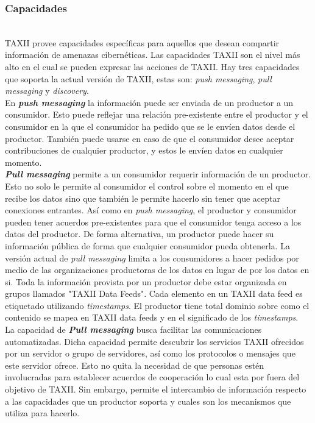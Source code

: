 \newpage
\subsubsection{Capacidades}\ \\

TAXII provee capacidades específicas para aquellos que desean compartir 
información de amenazas cibernéticas. Las capacidades TAXII son el nivel más 
alto en el cual se pueden expresar las acciones de TAXII. Hay tres capacidades 
que soporta la actual versión de TAXII, estas son: \textit{push messaging}, \textit{pull 
messaging} y \textit{discovery}.\\

En \textit{\textbf{push messaging}} la información puede ser enviada de un productor a un 
consumidor. Esto puede reflejar una relación pre-existente entre el productor y 
el consumidor en la que el consumidor ha pedido que se le envíen datos desde el 
productor. También puede usarse en caso de que el consumidor desee aceptar 
contribuciones de cualquier productor, y estos le envíen datos en cualquier 
momento.\\

\textit{\textbf{Pull messaging}} permite a un consumidor requerir información de un productor. 
Esto no solo le permite al consumidor el control sobre el momento en el que 
recibe los datos sino que también le permite hacerlo sin tener que aceptar 
conexiones entrantes. Así como en \textit{push messaging}, el productor y consumidor 
pueden tener acuerdos pre-existentes para que el consumidor tenga acceso a los 
datos del productor. De forma alternativa, un productor puede hacer su 
información pública de forma que cualquier consumidor pueda obtenerla. La 
versión actual de \textit{pull messaging} limita a los consumidores a hacer pedidos por 
medio de las organizaciones productoras de los datos en lugar de por los datos 
en si. Toda la información provista por un productor debe estar organizada en 
grupos llamados "TAXII Data Feeds". Cada elemento en un TAXII data feed es 
etiquetado utilizando \textit{timestamps}. El productor tiene total dominio sobre como el 
contenido se mapea en TAXII data feeds y en el significado de los \textit{timestamps}.\\

La capacidad de \textit{\textbf{Pull messaging}} busca facilitar las comunicaciones automatizadas. Dicha capacidad permite 
descubrir los servicios TAXII ofrecidos por un servidor o grupo de 
servidores, así como los protocolos o mensajes que este servidor ofrece. Esto no 
quita la necesidad de que personas estén involucradas para establecer acuerdos de 
cooperación lo cual esta por fuera del objetivo de TAXII. Sin embargo, permite 
el intercambio de información respecto a las capacidades que un productor 
soporta y cuales son los mecanismos que utiliza para hacerlo.


